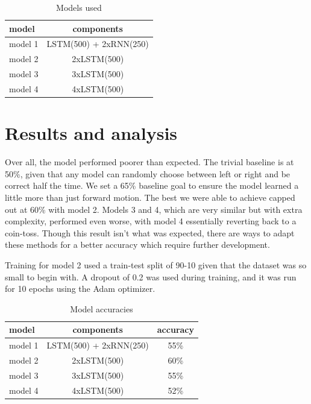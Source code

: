 \documentclass[10pt,twocolumn,letterpaper]{article}
\begin{document}
\begin{table}
\caption{Models used}
\begin{tabular}{l|c}
    \toprule
    model & components \\
    \midrule
    model 1 & LSTM(500) + 2xRNN(250)\\
    model 2 & 2xLSTM(500)\\
    model 3 & 3xLSTM(500)\\
    model 4 & 4xLSTM(500)\\
    \bottomrule
\end{tabular}
\end{table}

\section{Results and analysis}

Over all, the model performed poorer than expected.
The trivial baseline is at 50\%, given that any model can randomly choose between left or right and be correct half the time.
We set a 65\% baseline goal to ensure the model learned a little more than just forward motion.
The best we were able to achieve capped out at 60\% with model 2.
Models 3 and 4, which are very similar but with extra complexity, performed even worse, with model 4 essentially reverting back to a coin-toss.
Though this result isn't what was expected, there are ways to adapt these methods for a better accuracy which require further development.

Training for model 2 used a train-test split of 90-10 given that the dataset was so small to begin with.
A dropout of 0.2 was used during training, and it was run for 10 epochs using the Adam optimizer.

\begin{table}
\caption{Model accuracies}
\begin{tabular}{l|c|c}
    \toprule
    model & components & accuracy \\
    \midrule
    model 1 & LSTM(500) + 2xRNN(250) & 55\%\\
    model 2 & 2xLSTM(500) & 60\%\\
    model 3 & 3xLSTM(500) & 55\%\\
    model 4 & 4xLSTM(500) & 52\%\\
    \bottomrule
\end{tabular}
\end{table}
\end{document}
